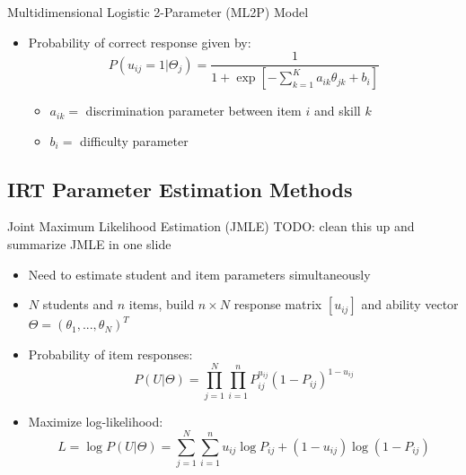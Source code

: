 \documentclass{beamer}
\theoremstyle{definition}
\begin{document}
\begin{frame}{Multidimensional Logistic 2-Parameter (ML2P) Model}
\begin{itemize}
\item Probability of correct response given by:
  \[P(u_{ij}=1 | \Theta_j) = \frac{1}{1 + \exp[-\sum_{k=1}^K a_{ik}\theta_{jk} + b_i]}\]
  \begin{itemize}
    \item<2-> $a_{ik} =$ discrimination parameter between item $i$ and skill $k$ 
    \item<2-> $b_i =$ difficulty parameter
  \end{itemize}
\end{itemize}
\end{frame}

\subsection{IRT Parameter Estimation Methods}

\begin{frame}{Joint Maximum Likelihood Estimation (JMLE)}
  TODO: clean this up and summarize JMLE in one slide %
\begin{itemize}
  \item Need to estimate student and item parameters simultaneously
  \item<2-> $N$ students and $n$ items, build $n\times N$ response matrix $[u_{ij}]$ and ability vector $\Theta = (\theta_1,...,\theta_N)^T$
  \item<2-> Probability of item responses:
  \[P(U|\Theta) = \prod_{j=1}^N \prod_{i=1}^n P_{ij}^{u_{ij}} (1-P_{ij})^{1-u_{ij}}\]
  \item<3> Maximize log-likelihood:
  \[L = \log P(U|\Theta) = \sum_{j=1}^N \sum_{i=1}^n u_{ij} \log P_{ij}  + (1-u_{ij}) \log (1-P_{ij})\]
\end{itemize}
\end{frame}
\end{document}
